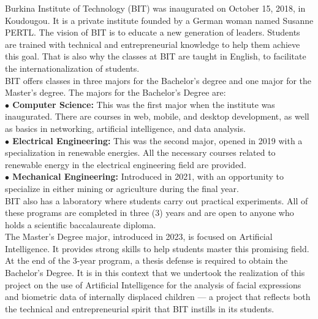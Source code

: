 \documentclass[a4paper,12pt,oneside]{report}
\begin{document}
Burkina Institute of Technology (BIT) was inaugurated on October 15, 2018,
in Koudougou. It is a private institute founded by a German woman named
Susanne PERTL. The vision of BIT is to educate a new generation of leaders.
Students are trained with technical and entrepreneurial knowledge to help them
achieve this goal. That is also why the classes at BIT are taught in English,
to facilitate the internationalization of students.\\

BIT offers classes in three majors for the Bachelor's degree and one major for
the Master's degree. The majors for the Bachelor's Degree are:\\

\textbf{$\bullet$ Computer Science:} This was the first major when the institute
was inaugurated. There are courses in web, mobile, and desktop development, as
well as basics in networking, artificial intelligence, and data analysis.\\

\textbf{$\bullet$ Electrical Engineering:} This was the second major, opened in
2019 with a specialization in renewable energies. All the necessary courses
related to renewable energy in the electrical engineering field are provided.\\

\textbf{$\bullet$ Mechanical Engineering:} Introduced in 2021, with an opportunity
to specialize in either mining or agriculture during the final year.\\

BIT also has a laboratory where students carry out practical experiments. All of
these programs are completed in three (3) years and are open to anyone who holds
a scientific baccalaureate diploma.\\

The Master's Degree major, introduced in 2023, is focused on Artificial
Intelligence. It provides strong skills to help students master this promising
field.\\

At the end of the 3-year program, a thesis defense is required to obtain the
Bachelor's Degree. It is in this context that we undertook the realization of
this project on the use of Artificial Intelligence for the analysis of facial
expressions and biometric data of internally displaced children --- a project
that reflects both the technical and entrepreneurial spirit that BIT instills
in its students.

\clearpage
\end{document}
